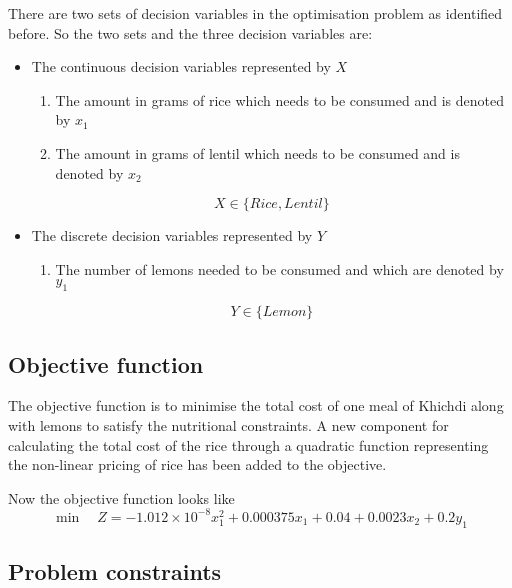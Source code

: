 \documentclass[
]{article}
\begin{document}
There are two sets of decision variables in the optimisation problem as identified before.
So the two sets and the three decision variables are:
\begin{itemize}
	\item The continuous decision variables represented by \(X\)
	      \begin{enumerate}
	      	\item The amount in grams of rice which needs to be consumed and is denoted by \(x_1\)
	      	\item The amount in grams of lentil which needs to be consumed and is denoted by \(x_2\)
	      \end{enumerate}
	      \[ X \in \{Rice, Lentil \}\]
	\item The discrete decision variables represented by \(Y\)
	      \begin{enumerate}
	      	\item The number of lemons needed to be consumed and which are denoted by \(y_1\)
	      \end{enumerate}
	      \[ Y \in \{Lemon\}\]
\end{itemize}

\hypertarget{objective-function-2}{%
	\subsection{Objective function}\label{objective-function-2}}

The objective function is to minimise the total cost of one meal of Khichdi along with lemons to satisfy the nutritional constraints.
A new component for calculating the total cost of the rice through a quadratic function representing the non-linear pricing of rice has been added to the objective.

Now the objective function looks like
\begin{equation*}
	\min \quad Z = -1.012 \times 10^{-8} x_1^2 + 0.000375x_1 + 0.04 + 0.0023x_2 + 0.2y_1
\end{equation*}


\hypertarget{problem-constraints-2}{%
	\subsection{Problem constraints}\label{problem-constraints-2}}
\end{document}
